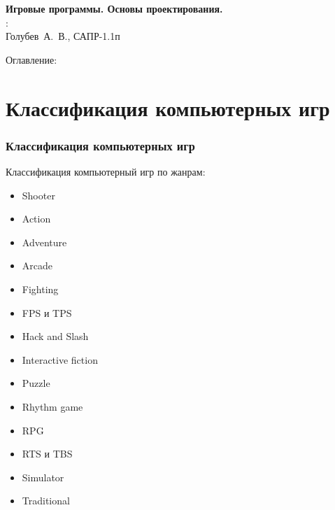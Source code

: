 \begin{frame}
    \begin{center}
        \vspace{2.5cm}
        \normalsize
        \textbf{Игровые программы. Основы проектирования.} \\
        \vspace{2.0cm}
        \raggedleft{}:\\Голубев~А.~В., САПР-1.1п\\
        \vspace{2.0cm}
        \vspace{\fill}
         \the\year
    \end{center}
\end{frame}

\begin{frame}
    Оглавление:
    \tableofcontents
\end{frame}

\section{Классификация компьютерных игр}
\begin{frame}
    \frametitle{Классификация компьютерных игр}
    Классификация компьютерный игр по жанрам:
    \begin{minipage}[t]{0.47\textwidth}
        \begin{itemize}
            \item Shooter
            \item Action
            \item Adventure
            \item Arcade
            \item Fighting
            \item FPS и TPS
            \item Hack and Slash
        \end{itemize}
    \end{minipage}
    \begin{minipage}[t]{0.47\textwidth}
        \begin{itemize}
            \item Interactive fiction
            \item Puzzle
            \item Rhythm game
            \item RPG
            \item RTS и TBS
            \item Simulator
            \item Traditional
        \end{itemize}
    \end{minipage}
\end{frame}

